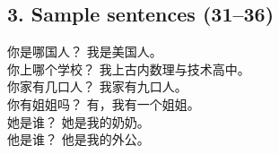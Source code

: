 \begin{CJK}{UTF8}{gbsn}
\section*{3. Sample sentences (31--36)}
你是哪国人？ 我是美国人。 \\
你上哪个学校？ 我上古内数理与技术高中。 \\
你家有几口人？ 我家有九口人。 \\
你有姐姐吗？ 有，我有一个姐姐。 \\
她是谁？ 她是我的奶奶。 \\
他是谁？ 他是我的外公。

\end{CJK}
